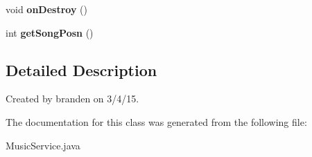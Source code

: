 \begin{DoxyCompactItemize}
\item 
\hypertarget{classcom_1_1chopin_1_1MusicService_a223dae031fa16712469118165bb3daa9}{}void {\bfseries on\+Destroy} ()\label{classcom_1_1chopin_1_1MusicService_a223dae031fa16712469118165bb3daa9}

\item 
\hypertarget{classcom_1_1chopin_1_1MusicService_aa400af16d24cf7732f868cafc0b5d59a}{}int {\bfseries get\+Song\+Posn} ()\label{classcom_1_1chopin_1_1MusicService_aa400af16d24cf7732f868cafc0b5d59a}

\end{DoxyCompactItemize}


\subsection{Detailed Description}
Created by branden on 3/4/15. 

The documentation for this class was generated from the following file\+:\begin{DoxyCompactItemize}
\item 
Music\+Service.\+java\end{DoxyCompactItemize}
